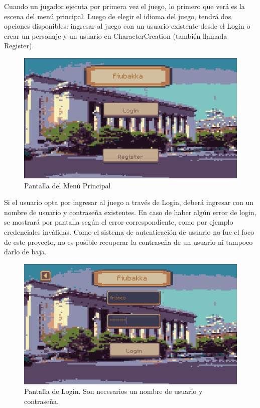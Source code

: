 Cuando un jugador ejecuta por primera vez el juego, lo primero que verá es la escena del menú principal.
Luego de elegir el idioma del juego, tendrá dos opciones disponibles: ingresar al juego
con un usuario existente desde el Login o crear un personaje y un usuario en CharacterCreation (también
llamada Register).

\begin{figure}[htbp]
    \centering
    \includegraphics[width=1.0\textwidth]{../assets/godot-main-menu.png}
    \caption{Pantalla del Menú Principal}
    \label{fig:godot-main-menu}
\end{figure}

Si el usuario opta por ingresar al juego a través de Login, deberá ingresar con un nombre de usuario
y contraseña existentes. En caso de haber algún error de login, se mostrará por pantalla según el error 
correspondiente, como por ejemplo credenciales inválidas. Como el sistema de autenticación de usuario no
fue el foco de este proyecto, no es posible recuperar la contraseña de un usuario ni tampoco darlo de baja.

\begin{figure}[htbp]
    \centering
    \includegraphics[width=1.0\textwidth]{../assets/godot-login.png}
    \caption{Pantalla de Login. Son necesarios un nombre de usuario y contraseña.}
    \label{fig:godot-main-menu}
\end{figure}

